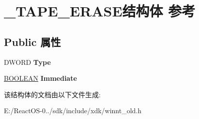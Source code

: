 \hypertarget{struct___t_a_p_e___e_r_a_s_e}{}\section{\+\_\+\+T\+A\+P\+E\+\_\+\+E\+R\+A\+S\+E结构体 参考}
\label{struct___t_a_p_e___e_r_a_s_e}
\subsection*{Public 属性}
\begin{DoxyCompactItemize}
\item 
\mbox{\label{struct___t_a_p_e___e_r_a_s_e_abaec4f86bab29d23378c5be89e09fcfa}} 
D\+W\+O\+RD {\bfseries Type}
\item 
\mbox{\label{struct___t_a_p_e___e_r_a_s_e_af53fc6f1b0c4ac86c468cc3a6f37186b}} 
\hyperlink{_processor_bind_8h_a112e3146cb38b6ee95e64d85842e380a}{B\+O\+O\+L\+E\+AN} {\bfseries Immediate}
\end{DoxyCompactItemize}


该结构体的文档由以下文件生成\+:\begin{DoxyCompactItemize}
\item 
E\+:/\+React\+O\+S-\/0../sdk/include/xdk/winnt\+\_\+old.\+h\end{DoxyCompactItemize}
